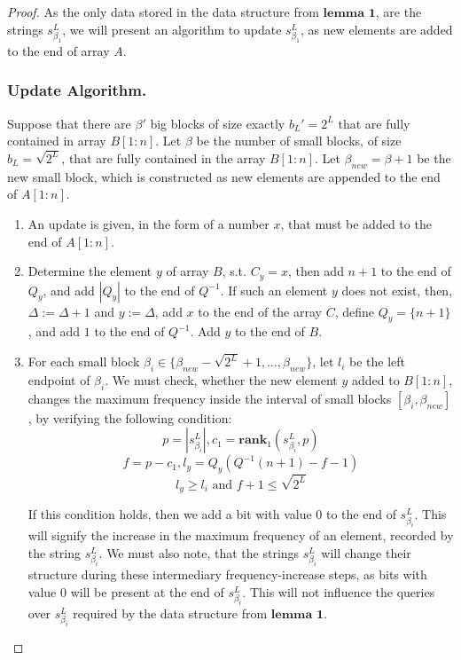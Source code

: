 \documentclass[runningheads]{llncs}
\begin{document}
\begin{proof}
    As the only data stored in the data structure from $\textbf{lemma 1}$, are the strings $s^L_{\beta_1}$, we will present an algorithm to update $s^L_{\beta_1}$, 
    as new elements are added to the end of array $A$.
    
    \subsubsection{Update Algorithm.}
    Suppose that there are $\beta'$ big blocks of size exactly $b_L'=2^L$ that are fully contained in array $B[1:n]$. 
    Let $\beta$ be the number of small blocks, of size $b_L=\sqrt{2^L}$, that are fully contained in the array $B[1:n]$. 
    Let $\beta_{new}=\beta+1$ be the new small block, which is constructed as new elements are appended to the end of $A[1:n]$.


    
    \begin{enumerate}
        \item[] An update is given, in the form of a number $x$, that must be added to the end of $A[1:n]$.
        
        \item Determine the element $y$ of array $B$, s.t. $C_{y}=x$, then add $n+1$ to the end of $Q_{y}$, and add $|Q_{y}|$ to the end of $Q^{-1}$.
        If such an element $y$ does not exist, then, $\Delta := \Delta+1$ and $y:=\Delta$, 
        add $x$ to the end of the array $C$, define $Q_{y}=\{n+1\}$, and add $1$ to the end of $Q^{-1}$. Add $y$ to the end of $B$. 
        
        \item 
        For each small block $\beta_i\in \{ \beta_{new}-\sqrt{2^L}+1, \dots , \beta_{new} \}$, let $l_i$ be the left endpoint of $\beta_i$. 
        We must check, whether the new element $y$ added to $B[1:n]$, changes the maximum frequency 
        inside the interval of small blocks $[\beta_i, \beta_{new}]$, by verifying the following condition:
        \[
            p=|s^{L}_{\beta_i}|, c_1 = \textbf{rank}_1(s^{L}_{\beta_i}, p)
        \]
        \[
            f=p-c_1, l_y = Q_{y}( Q^{-1}(n+1)-f-1 )
        \]
        \[
            l_y \geq l_i \text{ and } f+1\leq \sqrt{2^L}
        \]

        If this condition holds, then we add a bit with value $0$ to the end of $s^L_{\beta_i}$. This will signify 
        the increase in the maximum frequency of an element, recorded by the string $s^{L}_{\beta_i}$. We must also note, that the strings $s^{L}_{\beta_i}$ will change 
        their structure during these intermediary frequency-increase steps, as bits with value $0$ will be present at the end of $s^{L}_{\beta_i}$. 
        This will not influence the queries over $s^{L}_{\beta_i}$ required by the data structure from $\textbf{lemma 1}$.


\end{enumerate}
\end{proof}
\end{document}
